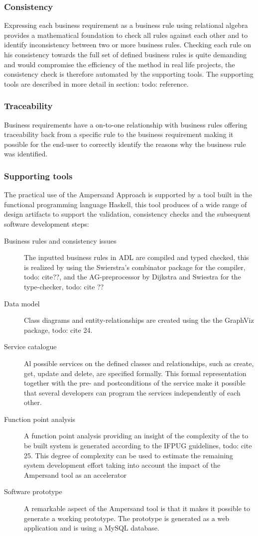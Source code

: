 \subsubsection{Consistency}
Expressing each business requirement as a business rule using relational algebra provides a mathematical foundation to check all rules against each other and to identify inconsistency between two or more business rules.  Checking each rule on his consistency towards the full set of defined business rules is quite demanding and would compromise the efficiency of the method in real life projects, the consistency check is therefore automated by the supporting tools. The supporting tools are described in more detail in section: todo: reference.

\subsubsection{Traceability}
Business requirements have a on-to-one relationship with business rules offering traceability back from a specific rule to the business requirement making it possible for the end-user to correctly identify the reasons why the business rule was identified.

\subsubsection{Supporting tools}
The practical use of the Ampersand Approach is supported by a tool built in the functional programming language Haskell, this tool produces of a wide range of design artifacts to support the validation, consistency checks and the subsequent software development steps:
\begin{description}
	\item[Business rules and consistency issues] The inputted business rules in ADL are compiled and typed checked, this is realized by using the Swierstra's combinator package for the compiler, todo: cite??,  and the AG-preprocessor by Dijkstra and Swiestra for the type-checker, todo: cite ??
	\item[Data model]  Class diagrams and entity-relationships are created using the the GraphViz package, todo: cite 24. 
	\item[Service catalogue] Al possible services on the defined classes and relationships, such as create, get, update and delete,  are specified formally. This formal representation together with the pre- and postconditions of the service make it possible that several developers can program the services independently of each other. 
	\item[Function point analysis] A function point analysis providing an insight of the complexity of the to be built system is generated according to the IFPUG guidelines, todo: cite 25. This degree of complexity can be used to estimate the remaining system development effort taking into account the impact of the Ampersand tool as an accelerator
	\item[Software prototype] A remarkable aspect of the Ampersand tool is that it makes it possible to generate a working prototype. The prototype is generated as a web application and is using a MySQL database.
\end{description}
 
